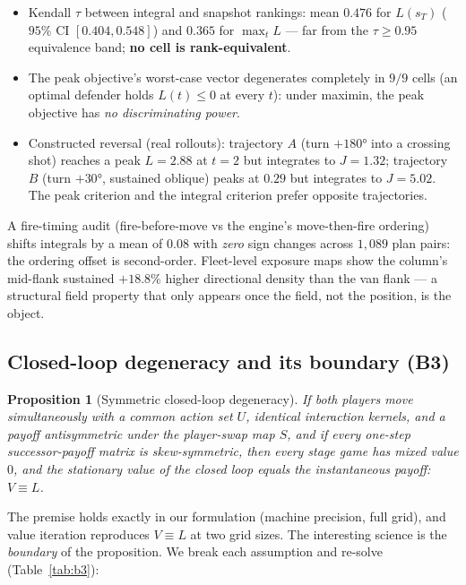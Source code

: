 \documentclass[12pt,a4paper]{article}
\newtheorem{proposition}{Proposition}
\begin{document}
\begin{itemize}
\item Kendall $\tau$ between integral and snapshot rankings: mean $0.476$
for $L(s_T)$ ($95\%$ CI $[0.404,0.548]$) and $0.365$ for $\max_t L$ ---
far from the $\tau\ge0.95$ equivalence band; \textbf{no cell is
rank-equivalent}.
\item The peak objective's worst-case vector degenerates completely in
$9/9$ cells (an optimal defender holds $L(t)\le0$ at every $t$): under
maximin, the peak objective has \emph{no discriminating power}.
\item Constructed reversal (real rollouts): trajectory $A$ (turn $+180°$
into a crossing shot) reaches a peak $L=2.88$ at $t=2$ but integrates to
$J=1.32$; trajectory $B$ (turn $+30°$, sustained oblique) peaks at $0.29$
but integrates to $J=5.02$.  The peak criterion and the integral criterion
prefer opposite trajectories.
\end{itemize}

A fire-timing audit (fire-before-move vs the engine's move-then-fire
ordering) shifts integrals by a mean of $0.08$ with \emph{zero} sign changes
across $1{,}089$ plan pairs: the ordering offset is second-order.
Fleet-level exposure maps show the column's mid-flank sustained
$+18.8\%$ higher directional density than the van flank --- a structural
field property that only appears once the field, not the position, is the
object.

\subsection{Closed-loop degeneracy and its boundary (B3)}\label{sec:degeneracy}

\begin{proposition}[Symmetric closed-loop degeneracy]
If both players move simultaneously with a common action set $U$, identical
interaction kernels, and a payoff antisymmetric under the player-swap map
$S$, and if every one-step successor-payoff matrix is skew-symmetric, then
every stage game has mixed value $0$, and the stationary value of the
closed loop equals the instantaneous payoff: $V\equiv L$.
\end{proposition}

The premise holds exactly in our formulation (machine precision, full
grid), and value iteration reproduces $V\equiv L$ at two grid sizes.
The interesting science is the \emph{boundary} of the proposition.  We
break each assumption and re-solve (Table~\ref{tab:b3}):
\end{document}
